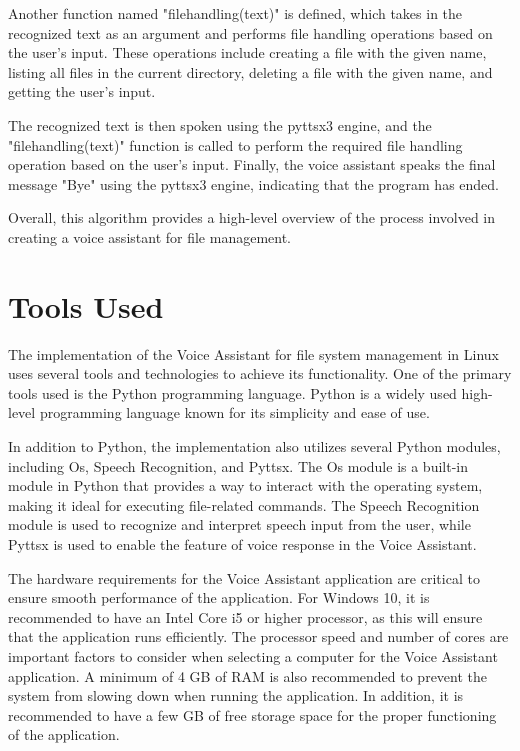 \documentclass[conference]{IEEEtran}
\begin{document}
\par Another function named "filehandling(text)" is defined, which takes in the recognized text as an argument and performs file handling operations based on the user's input. These operations include creating a file with the given name, listing all files in the current directory, deleting a file with the given name, and getting the user's input.

\par The recognized text is then spoken using the pyttsx3 engine, and the "filehandling(text)" function is called to perform the required file handling operation based on the user's input. Finally, the voice assistant speaks the final message "Bye" using the pyttsx3 engine, indicating that the program has ended.

\par Overall, this algorithm provides a high-level overview of the process involved in creating a voice assistant for file management.

\section{Tools Used}
The implementation of the Voice Assistant for file system management in Linux uses several tools and technologies to achieve its functionality. One of the primary tools used is the Python programming language. Python is a widely used high-level programming language known for its simplicity and ease of use.

\par In addition to Python, the implementation also utilizes several Python modules, including Os, Speech Recognition, and Pyttsx. The Os module is a built-in module in Python that provides a way to interact with the operating system, making it ideal for executing file-related commands. The Speech Recognition module is used to recognize and interpret speech input from the user, while Pyttsx is used to enable the feature of voice response in the Voice Assistant.

\par The hardware requirements for the Voice Assistant application are critical to ensure smooth performance of the application. For Windows 10, it is recommended to have an Intel Core i5 or higher processor, as this will ensure that the application runs efficiently. The processor speed and number of cores are important factors to consider when selecting a computer for the Voice Assistant application. A minimum of 4 GB of RAM is also recommended to prevent the system from slowing down when running the application. In addition, it is recommended to have a few GB of free storage space for the proper functioning of the application.
\end{document}
